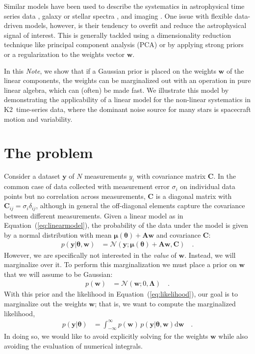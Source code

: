 \documentclass[modern]{rnaastex}
\newcommand{\project}[1]{\textsf{#1}}
\newcommand{\ktwo}{\project{K2}}
\newcommand{\documentname}{\textsl{Note}}
\renewcommand{\eqref}[1]{\ref{eq:#1}}
\newcommand{\Eq}[1]{Equation~(\eqref{#1})}
\newcommand{\eq}[1]{\Eq{#1}}
\newcommand{\eqlabel}[1]{\label{eq:#1}}
\newcommand{\dd}{\ensuremath{ \mathrm{d}}}
\newcommand{\bvec}[1]{{\ensuremath{\boldsymbol{#1}}}}
\newcommand{\Normal}{\ensuremath{\mathcal{N}}}
\newcommand{\mA}{\ensuremath{\bvec{A}}}
\newcommand{\mC}{\ensuremath{\bvec{C}}}
\newcommand{\mL}{\ensuremath{\bvec{\Lambda}}}
\newcommand{\vw}{\ensuremath{\bvec{w}}}
\newcommand{\vy}{\ensuremath{\bvec{y}}}
\newcommand{\vt}{\ensuremath{\bvec{\theta}}}
\newcommand{\vm}{\ensuremath{\bvec{\mu}(\bvec{\theta})}}
\begin{document}
Similar models have been used to describe the systematics in astrophysical time
series data \citep{Smith:2012, Wang:2016, Luger:2016}, galaxy or stellar spectra
\citep{Tsalmantza:2012, Ness:2015}, and imaging \citep{Fergus:2014,
Wang:2017}.
One issue with flexible data-driven models, however, is their tendency to
overfit and reduce the astrophysical signal of interest.
This is generally tackled using a dimensionality reduction technique like
principal component analysis (PCA) or by applying strong priors or a
regularization to the weights vector $\vw$.

In this \documentname, we show that if a
Gaussian prior is placed on the weights $\vw$ of the linear
components, the weights can be marginalized out with an operation in pure linear
algebra, which can (often) be made fast.
We illustrate this model by demonstrating the applicability of a linear model
for the non-linear systematics in \ktwo\ time-series data, where the dominant
noise source for many stars is spacecraft motion and variability.

\section{The problem}

Consider a dataset $\vy$ of $N$ measurements $y_i$ with covariance
matrix $\mC$.
In the common case of data collected with measurement error $\sigma_i$ on
individual data points but no correlation across measurements, $\mC$ is a
diagonal matrix with $\mC_{ij} = \sigma_{i}\delta_{ij}$, although in general
the off-diagonal elements capture the covariance between different
measurements. Given a linear model as in
\eq{linearmodel}, the probability of the data under the model is given by a
normal distribution with mean $\vm + \mA \vw$ and covariance $\mC$:
%
\begin{align}\eqlabel{likelihood}
p(\vy | \vt, \vw) &= \Normal(\vy; \vm + \mA \vw, \mC) \quad.
\end{align}
%
However, we are specifically not interested in the \emph{value} of $\vw$.
Instead, we will marginalize over it.
To perform this marginalization we must place a prior on $\vw$ that we will
assume to be Gaussian:
%
\begin{align}
p(\vw) &= \Normal(\vw; 0, \mL) \quad. \nonumber
\end{align}
%
With this prior and the likelihood in \eq{likelihood}, our goal is to marginalize
out the weights $\vw$; that is, we want to compute the marginalized
likelihood,
%
\begin{align}
p(\vy | \vt) &= \int_{-\infty}^{\infty} p(\vw)\,p(\vy | \vt, \vw) \dd\vw \quad.
\end{align}
%
In doing so, we would like to avoid explicitly solving for the weights $\vw$
while also avoiding the evaluation of numerical integrals.
\end{document}
